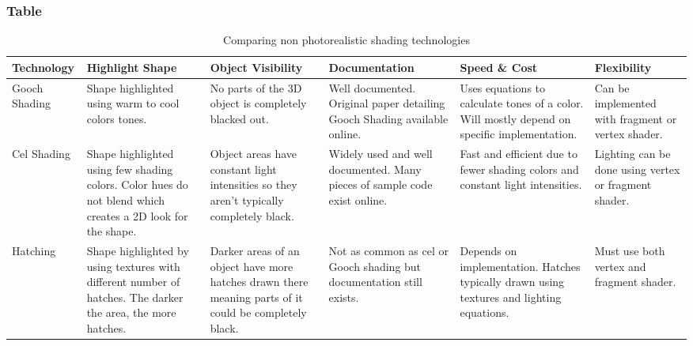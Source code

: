 \documentclass[10pt,journal,compsoc,draftclsnofoot]{IEEEtran}
\begin{document}
\subsubsection{Table}
\begin{center}
\begin{table}[H]
\begin{tabular}{ | m{7em} | m{7em} | m{7em} | m{7em} | m{7em} | m{7em} |  } 
\hline
\textbf{Technology}  & \textbf{Highlight Shape} & \textbf{Object Visibility} & \textbf{Documentation} & \textbf{Speed \& Cost} & \textbf{Flexibility} \\ \hline
Gooch Shading & Shape highlighted using warm to cool colors tones. & No parts of the 3D object is completely blacked out. & Well documented. Original paper detailing Gooch Shading available online. & Uses equations to calculate tones of a color. Will mostly depend on specific implementation. & Can be implemented with fragment or vertex shader.  \\ \hline
Cel Shading & Shape highlighted using few shading colors. Color hues do not blend which creates a 2D look for the shape. & Object areas have constant light intensities so they aren't typically completely black. & Widely used and well documented. Many pieces of sample code exist online. & Fast and efficient due to fewer shading colors and constant light intensities. & Lighting can be done using vertex or fragment shader.  \\ \hline
Hatching & Shape highlighted by using textures with different number of hatches. The darker the area, the more hatches. & Darker areas of an object have more hatches drawn there meaning parts of it could be completely black. & Not as common as cel or Gooch shading but documentation still exists. & Depends on implementation. Hatches typically drawn using textures and lighting equations. & Must use both vertex and fragment shader. \\ \hline
\end{tabular}
\newline
\caption{Comparing non photorealistic shading technologies}
\label{table:nonphoto}
\end{table}
\end{center}

\newpage
\end{document}
